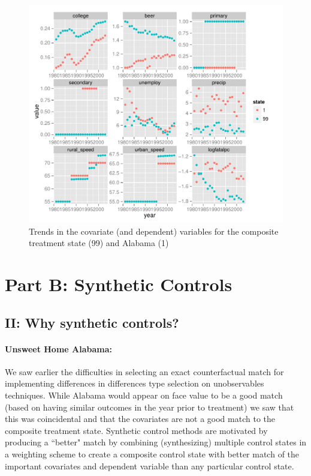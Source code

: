 \documentclass[letterpaper, 12pt]{article}
\begin{document}
\begin{figure}[htbp]
\begin{center}
\includegraphics{img-ps2b-compareStatesFacets.pdf}
\caption{Trends in the covariate (and dependent) variables for the composite treatment state (99) and Alabama (1)}
\label{fig:a22}
\end{center}
\end{figure}


\section{Part B: Synthetic Controls}

\subsection{II: Why synthetic controls?}

\paragraph{Unsweet Home Alabama:}
We saw earlier the difficulties in selecting an exact counterfactual match for implementing differences in differences type selection on unobservables techniques.  While Alabama would appear on face value to be a good match (based on having similar outcomes in the year prior to treatment) we saw that this was coincidental and that the covariates are not a good match to the composite treatment state.  Synthetic control methods are motivated by producing a ``better" match by combining (synthesizing) multiple control states in a weighting scheme to create a composite control state with better match of the important covariates and dependent variable than any particular control state.  
\end{document}
